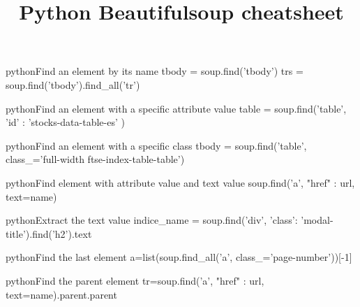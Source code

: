 \documentclass[10pt,a4paper]{article}
\title{\color{w3schools}Python Beautifulsoup cheatsheet
}
\begin{document}
\maketitle

\small
\begin{multicols}{3}

\thispagestyle{empty}
\scriptsize



\begin{codebox}{python}{Find an element by its name}
tbody = soup.find('tbody')
trs = soup.find('tbody').find_all('tr')

\end{codebox}

\begin{codebox}{python}{Find an element with a specific attribute value}
table = soup.find('table', {'id' : 'stocks-data-table-es'} )

\end{codebox}

\begin{codebox}{python}{Find an element with a specific class}
tbody = soup.find('table', class_='full-width ftse-index-table-table')

\end{codebox}

\begin{codebox}{python}{Find element with attribute value and text value}
soup.find('a', {"href" : url}, text=name)

\end{codebox}

\begin{codebox}{python}{Extract the text value}
indice_name = soup.find('div', {'class': 'modal-title'}).find('h2').text

\end{codebox}

\begin{codebox}{python}{Find the last element}
a=list(soup.find_all('a', class_='page-number'))[-1]

\end{codebox}

\begin{codebox}{python}{Find the parent element}
tr=soup.find('a', {"href" : url}, text=name).parent.parent

\end{codebox}


\AtNextBibliography{\footnotesize}
\printbibliography  
\end{multicols}
\end{document}
